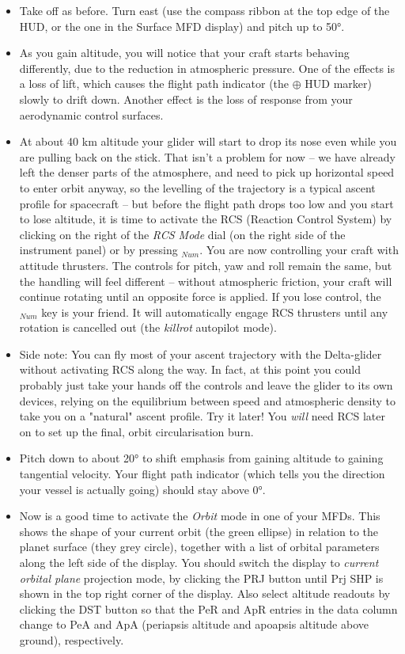 \documentclass[Orbiter User Manual.tex]{subfiles}
\begin{document}
\begin{itemize}
\item Take off as before. Turn east (use the compass ribbon at the top edge of the HUD, or the one in the Surface MFD display) and pitch up to 50°.
\item As you gain altitude, you will notice that your craft starts behaving differently, due to the reduction in atmospheric pressure. One of the effects is a loss of lift, which causes the flight path indicator (the $\oplus$ HUD marker) slowly to drift down. Another effect is the loss of response from your aerodynamic control surfaces.
\item At about 40 km altitude your glider will start to drop its nose even while you are pulling back on the stick. That isn't a problem for now – we have already left the denser parts of the atmosphere, and need to pick up horizontal speed to enter orbit anyway, so the levelling of the trajectory is a typical ascent profile for spacecraft – but before the flight path drops too low and you start to lose altitude, it is time to activate the RCS (Reaction Control System) by clicking on the right of the \textit{RCS Mode} dial (on the right side of the instrument panel) or by pressing \Ctrl\keystroke{/}$_{Num}$. You are now controlling your craft with attitude thrusters. The controls for pitch, yaw and roll remain the same, but the handling will feel different – without atmospheric friction, your craft will continue rotating until an opposite force is applied. If you lose control, the $_{Num}$ key is your friend. It will automatically engage RCS thrusters until any rotation is cancelled out (the \textit{killrot} autopilot mode).
\item Side note: You can fly most of your ascent trajectory with the Delta-glider without activating RCS along the way. In fact, at this point you could probably just take your hands off the controls and leave the glider to its own devices, relying on the equilibrium between speed and atmospheric density to take you on a "natural" ascent profile. Try it later! You \textit{will} need RCS later on to set up the final, orbit circularisation burn.
 \item Pitch down to about 20° to shift emphasis from gaining altitude to gaining tangential velocity. Your flight path indicator (which tells you the direction your vessel is actually going) should stay above 0°.
\item Now is a good time to activate the \textit{Orbit} mode in one of your MFDs. This shows the shape of your current orbit (the green ellipse) in relation to the planet surface (they grey circle), together with a list of orbital parameters along the left side of the display. You should switch the display to \textit{current orbital plane} projection mode, by clicking the PRJ button until Prj SHP is shown in the top right corner of the display. Also select altitude readouts by clicking the DST button so that the PeR and ApR entries in the data column change to PeA and ApA (periapsis altitude and apoapsis altitude above ground), respectively.

\end{itemize}
\end{document}
